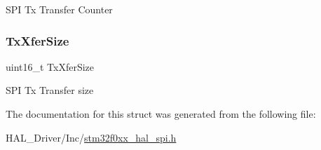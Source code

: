 S\+PI Tx Transfer Counter \mbox{\label{struct_____s_p_i___handle_type_def_a80907b65d6f9541bc0dee444d16bc45b}} 
\subsubsection{\texorpdfstring{Tx\+Xfer\+Size}{TxXferSize}}
{\footnotesize\ttfamily uint16\+\_\+t Tx\+Xfer\+Size}

S\+PI Tx Transfer size 

The documentation for this struct was generated from the following file\+:\begin{DoxyCompactItemize}
\item 
H\+A\+L\+\_\+\+Driver/\+Inc/\hyperlink{stm32f0xx__hal__spi_8h}{stm32f0xx\+\_\+hal\+\_\+spi.\+h}\end{DoxyCompactItemize}
